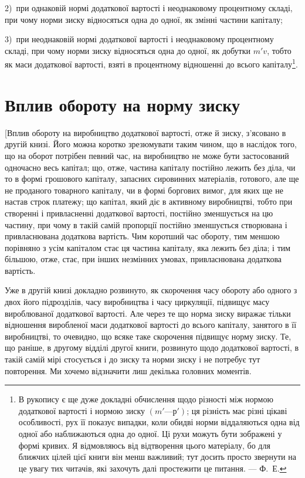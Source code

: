 \parcont{}  %
2)~при однаковій нормі додаткової вартості і неоднаковому
процентному складі, при чому норми зиску відносяться одна до
одної, як змінні частини капіталу;

3)~при неоднаковій нормі додаткової вартості і неоднаковому
процентному складі, при чому норми зиску відносяться одна до
одної, як добутки $m'v$, тобто як маси додаткової вартості,
взяті в процентному відношенні до всього капіталу\footnote{
В рукопису є ще дуже докладні обчислення щодо різності між нормою
додаткової вартості і нормою зиску $(m' — р')$; ця різність має різні цікаві особливості,
рух її показує випадки, коли обидві норми віддаляються одна від
одної або наближаються одна до одної. Ці рухи можуть бути зображені у формі
кривих. Я відмовляюсь від відтворення цього матеріалу, бо для ближчих цілей
цієї книги він менш важливий; тут досить просто звернути на це увагу тих
читачів, які захочуть далі простежити це питання. — Ф.~Е.
}.

\section{Вплив обороту на норму зиску}

[Вплив обороту на виробництво додаткової вартості, отже
й зиску, з’ясовано в другій книзі. Його можна коротко зрезюмувати
таким чином, що в наслідок того, що на оборот потрібен
певний час, на виробництво не може бути застосований одночасно
весь капітал; що, отже, частина капіталу постійно лежить без
діла, чи то в формі грошового капіталу, запасних сировинних
матеріалів, готового, але ще не проданого товарного капіталу,
чи в формі боргових вимог, для яких ще не настав строк платежу;
що капітал, який діє в активному виробництві, тобто при
створенні і привласненні додаткової вартості, постійно зменшується
на цю частину, при чому в такій самій пропорції постійно
зменшується створювана і привласнювана додаткова вартість.
Чим коротший час обороту, тим меншою порівняно з усім
капіталом стає ця частина капіталу, яка лежить без діла; і тим
більшою, отже, стає, при інших незмінних умовах, привласнювана
додаткова вартість.

Уже в другій книзі докладно розвинуто, як скорочення часу
обороту або одного з двох його підрозділів, часу виробництва
і часу циркуляції, підвищує масу вироблюваної додаткової вартості.
Але через те що норма зиску виражає тільки відношення
виробленої маси додаткової вартості до всього капіталу, занятого
в її виробництві, то очевидно, що всяке таке скорочення підвищує
норму зиску. Те, що раніше, в другому відділі другої
книги, розвинуто щодо додаткової вартості, в такій самій мірі
стосується і до зиску та норми зиску і не потребує тут повторення.
Ми хочемо відзначити лиш декілька головних моментів.

